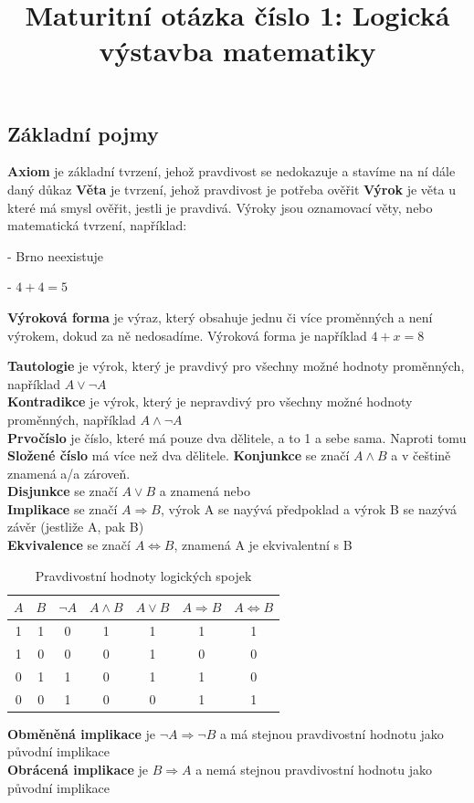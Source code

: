 \documentclass[12pt]{article}
\title{Maturitní otázka číslo 1: Logická výstavba matematiky}
\author{}
\date{}
\begin{document}
\maketitle
\subsection*{Základní pojmy}
\textbf{Axiom} je základní tvrzení, jehož pravdivost se nedokazuje a stavíme na ní dále daný důkaz
\textbf{Věta} je tvrzení, jehož pravdivost je potřeba ověřit
\textbf{Výrok} je věta u které má smysl ověřit, jestli je pravdivá. Výroky jsou oznamovací věty, nebo matematická tvrzení, například:

- Brno neexistuje

- $4 + 4 = 5$

\textbf{Výroková forma} je výraz, který obsahuje jednu či více proměnných a není výrokem, dokud za ně nedosadíme. Výroková forma je například $4 + x = 8$

\textbf{Tautologie} je výrok, který je pravdivý pro všechny možné hodnoty proměnných, například $A \lor \neg A$\\
\textbf{Kontradikce} je výrok, který je nepravdivý pro všechny možné hodnoty proměnných, například $A \land \neg A$\\
\textbf{Prvočíslo} je číslo, které má pouze dva dělitele, a to 1 a sebe sama. Naproti tomu \textbf{Složené číslo} má více než dva dělitele.
\textbf{Konjunkce} se značí $A \land B$ a v češtině znamená a/a zároveň.\\
\textbf{Disjunkce} se značí $A \lor B$ a znamená nebo\\
\textbf{Implikace} se značí $A \Rightarrow B$, výrok A se nayývá předpoklad a výrok B se nazývá závěr (jestliže A, pak B)\\
\textbf{Ekvivalence} se značí $A \Leftrightarrow B$, znamená A je ekvivalentní s B\\

\begin{table}[h]
\centering
\renewcommand{\arraystretch}{1.2}
\begin{tabular}{|c|c|c|c|c|c|c|}
\hline
$A$ & $B$ & $\neg A$ & $A \land B$ & $A \lor B$ & $A \Rightarrow B$ & $A \Leftrightarrow B$ \\
\hline
1 & 1 & 0 & 1 & 1 & 1 & 1 \\
1 & 0 & 0 & 0 & 1 & 0 & 0 \\
0 & 1 & 1 & 0 & 1 & 1 & 0 \\
0 & 0 & 1 & 0 & 0 & 1 & 1 \\
\hline
\end{tabular}
\caption*{Pravdivostní hodnoty logických spojek}
\end{table}
\textbf{Obměněná implikace} je $\neg A \Rightarrow \neg B$ a má stejnou pravdivostní hodnotu jako původní implikace\\
\textbf{Obrácená implikace} je $B \Rightarrow A$ a nemá stejnou pravdivostní hodnotu jako původní implikace\\
\end{document}

